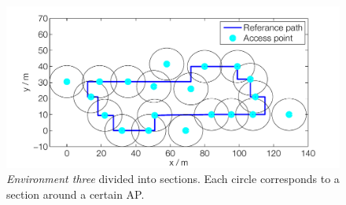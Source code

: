 \documentclass{LTHthesis}
\begin{document}
\begin{figure}[!hbt]

\includegraphics[width=1\textwidth ]{images/adapt_parameters/ap_sections}
\caption{\emph{Environment three} divided into sections. Each circle corresponds to a section around a certain AP.}\label{alpha_sections}
\end{figure}
\end{document}
